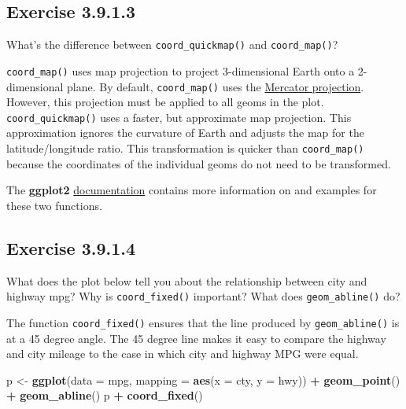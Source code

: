 \documentclass[]{book}
\newenvironment{Shaded}{\begin{snugshade}}{\end{snugshade}}
\newcommand{\DataTypeTok}[1]{\textcolor[rgb]{0.13,0.29,0.53}{#1}}
\newcommand{\KeywordTok}[1]{\textcolor[rgb]{0.13,0.29,0.53}{\textbf{#1}}}
\newcommand{\NormalTok}[1]{#1}
\newcommand{\OperatorTok}[1]{\textcolor[rgb]{0.81,0.36,0.00}{\textbf{#1}}}
\newcommand{\StringTok}[1]{\textcolor[rgb]{0.31,0.60,0.02}{#1}}
\theoremstyle{plain}
\theoremstyle{remark}
\begin{document}
\hypertarget{exercise-3.9.1.3}{%
\subsection*{\texorpdfstring{Exercise
{3.9.1.3}}{Exercise 3.9.1.3}}\label{exercise-3.9.1.3}}

What's the difference between \texttt{coord\_quickmap()} and
\texttt{coord\_map()}?

\texttt{coord\_map()} uses map projection to project 3-dimensional Earth
onto a 2-dimensional plane. By default, \texttt{coord\_map()} uses the
\href{https://en.wikipedia.org/wiki/Mercator_projection}{Mercator
projection}. However, this projection must be applied to all geoms in
the plot. \texttt{coord\_quickmap()} uses a faster, but approximate map
projection. This approximation ignores the curvature of Earth and
adjusts the map for the latitude/longitude ratio. This transformation is
quicker than \texttt{coord\_map()} because the coordinates of the
individual geoms do not need to be transformed.

The \textbf{ggplot2}
\href{https://ggplot2.tidyverse.org/reference/coord_map.html}{documentation}
contains more information on and examples for these two functions.

\hypertarget{exercise-3.9.1.4}{%
\subsection*{\texorpdfstring{Exercise
{3.9.1.4}}{Exercise 3.9.1.4}}\label{exercise-3.9.1.4}}

What does the plot below tell you about the relationship between city
and highway mpg? Why is \texttt{coord\_fixed()} important? What does
\texttt{geom\_abline()} do?

The function \texttt{coord\_fixed()} ensures that the line produced by
\texttt{geom\_abline()} is at a 45 degree angle. The 45 degree line
makes it easy to compare the highway and city mileage to the case in
which city and highway MPG were equal.

\begin{Shaded}
\begin{Highlighting}[]
\NormalTok{p <-}\StringTok{ }\KeywordTok{ggplot}\NormalTok{(}\DataTypeTok{data =}\NormalTok{ mpg, }\DataTypeTok{mapping =} \KeywordTok{aes}\NormalTok{(}\DataTypeTok{x =}\NormalTok{ cty, }\DataTypeTok{y =}\NormalTok{ hwy)) }\OperatorTok{+}
\StringTok{  }\KeywordTok{geom_point}\NormalTok{() }\OperatorTok{+}
\StringTok{  }\KeywordTok{geom_abline}\NormalTok{()}
\NormalTok{p }\OperatorTok{+}\StringTok{ }\KeywordTok{coord_fixed}\NormalTok{()}
\end{Highlighting}
\end{Shaded}
\end{document}

